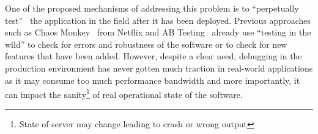 
One of the proposed mechanisms of addressing this problem is to ``perpetually test''~\cite{perpetual} the application in the field after it has been deployed. 
Previous approaches such as Chaos Monkey~\cite{chaosmonkey} from Netflix and AB Testing~\cite{abtesting} already use ``testing in the wild'' to check for errors and robustness of the software or to check for new features that have been added.  
However, despite a clear need, debugging in the production environment has never gotten much traction in real-world applications as it may consume too much performance bandwidth and more importantly, it can impact the sanity\footnote{State of server may change leading to crash or wrong output} of real operational state of the software.


